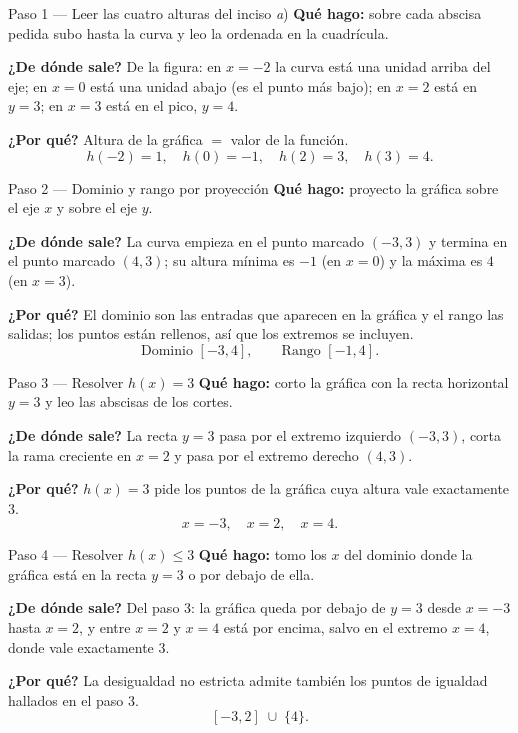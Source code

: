 \documentclass[11pt]{article}
\begin{document}
\begin{paso}{Paso 1 --- Leer las cuatro alturas del inciso \emph{a})}
\textbf{Qué hago:} sobre cada abscisa pedida subo hasta la curva y leo la ordenada en la cuadrícula.

\textbf{¿De dónde sale?} De la figura: en $x=-2$ la curva está una unidad arriba del eje; en $x=0$ está una unidad abajo (es el punto más bajo); en $x=2$ está en $y=3$; en $x=3$ está en el pico, $y=4$.

\textbf{¿Por qué?} Altura de la gráfica $=$ valor de la función.
\[
h(-2)=1,\quad h(0)=-1,\quad h(2)=3,\quad h(3)=4.
\]
\end{paso}

\begin{paso}{Paso 2 --- Dominio y rango por proyección}
\textbf{Qué hago:} proyecto la gráfica sobre el eje $x$ y sobre el eje $y$.

\textbf{¿De dónde sale?} La curva empieza en el punto marcado $(-3,3)$ y termina en el punto marcado $(4,3)$; su altura mínima es $-1$ (en $x=0$) y la máxima es $4$ (en $x=3$).

\textbf{¿Por qué?} El dominio son las entradas que aparecen en la gráfica y el rango las salidas; los puntos están rellenos, así que los extremos se incluyen.
\[
\text{Dominio } [-3,4], \qquad \text{Rango } [-1,4].
\]
\end{paso}

\begin{paso}{Paso 3 --- Resolver $h(x)=3$}
\textbf{Qué hago:} corto la gráfica con la recta horizontal $y=3$ y leo las abscisas de los cortes.

\textbf{¿De dónde sale?} La recta $y=3$ pasa por el extremo izquierdo $(-3,3)$, corta la rama creciente en $x=2$ y pasa por el extremo derecho $(4,3)$.

\textbf{¿Por qué?} $h(x)=3$ pide los puntos de la gráfica cuya altura vale exactamente $3$.
\[
x=-3,\quad x=2,\quad x=4.
\]
\end{paso}

\begin{paso}{Paso 4 --- Resolver $h(x)\le 3$}
\textbf{Qué hago:} tomo los $x$ del dominio donde la gráfica está en la recta $y=3$ o por debajo de ella.

\textbf{¿De dónde sale?} Del paso 3: la gráfica queda por debajo de $y=3$ desde $x=-3$ hasta $x=2$, y entre $x=2$ y $x=4$ está por encima, salvo en el extremo $x=4$, donde vale exactamente $3$.

\textbf{¿Por qué?} La desigualdad no estricta admite también los puntos de igualdad hallados en el paso 3.
\[
[-3,2]\;\cup\;\{4\}.
\]
\end{paso}
\end{document}
